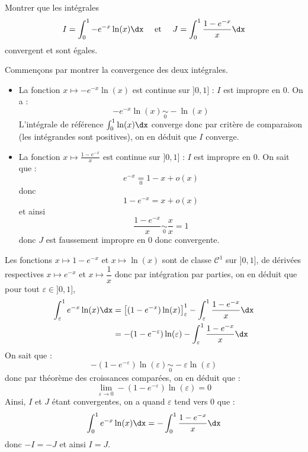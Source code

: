\documentclass[a4paper,10pt]{report}
\begin{document}
\begin{Exercice}{} Montrer que les intégrales 
$$ I=\int_{0}^1 -e^{-x} \ln(x) \dx \quad \hbox{ et } \quad J= \int_{0}^1 \frac{1-e^{-x}}{x} \dx$$
convergent et sont égales.
\end{Exercice}

\corr Commençons par montrer la convergence des deux intégrales.

\begin{itemize}
\item La fonction $x \mapsto -e^{-x} \ln(x)$ est continue sur $]0,1]$ : $I$ est impropre en $0$. On a :
$$  -e^{-x} \ln(x) \underset{0}{\sim} -\ln(x)$$
L'intégrale de référence $\int_0^1 \ln(x) \dx$ converge donc par critère de comparaison (les intégrandes sont positives), on en déduit que $I$ converge.
\item La fonction $x \mapsto \frac{1-e^{-x}}{x}$ est continue sur $]0,1]$ : $I$ est impropre en $0$. On sait que :
$$ e^{-x} \underset{0}{=} 1-x + o(x) $$
donc 
$$ 1-e^{-x} = x + o(x)$$
et ainsi 
$$ \frac{1-e^{-x}}{x} \underset{0}{\sim} \dfrac{x}{x}= 1$$
donc $J$ est faussement impropre en $0$ donc convergente.
\end{itemize}
 Les fonctions $x \mapsto 1-e^{-x}$ et $x \mapsto \ln(x)$ sont de classe $\mathcal{C}^1$ sur $]0,1]$, de dérivées respectives $x \mapsto e^{-x}$ et $x \mapsto \dfrac{1}{x}$ donc par intégration par parties, on en déduit que pour tout $\varepsilon \in ]0,1]$,
\begin{align*}
\int_{\varepsilon}^1 e^{-x} \ln(x) \dx & = \left[(1-e^{-x}) \ln(x) \right]_{\varepsilon}^1  - \int_{\varepsilon}^1 \dfrac{1-e^{-x}}{x} \dx \\
& = - (1-e^{-\varepsilon}) \ln(\varepsilon)  - \int_{\varepsilon}^1 \dfrac{1-e^{-x}}{x} \dx \\
\end{align*}
On sait que :
$$ - (1-e^{-\varepsilon}) \ln(\varepsilon) \underset{0}{\sim} - \varepsilon \ln(\varepsilon)$$
donc par théorème des croissances comparées, on en déduit que :
$$ \lim_{\varepsilon \rightarrow 0}  - (1-e^{-\varepsilon}) \ln(\varepsilon) = 0$$
Ainsi, $I$ et $J$ étant convergentes, on a quand $\varepsilon$ tend vers $0$ que :
$$ \int_{0}^1 e^{-x} \ln(x) \dx =  - \int_{0}^1 \dfrac{1-e^{-x}}{x} \dx $$
donc $-I=-J$ et ainsi $I=J$.
\end{document}
